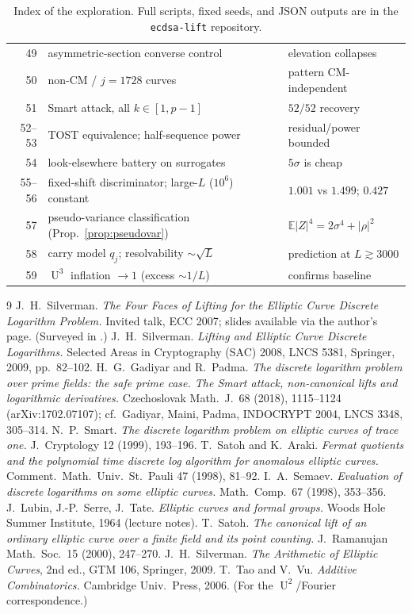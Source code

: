 \documentclass[11pt]{article}
\theoremstyle{definition}
\DeclareMathOperator{\Uk}{U}
\begin{document}
\begin{table}[H]
\begin{tabular}{rll}
\midrule
49     & asymmetric-section converse control & elevation collapses\\
50     & non-CM / $j{=}1728$ curves & pattern CM-independent\\
51     & Smart attack, all $k\in[1,p{-}1]$ & $52/52$ recovery\\
52--53 & TOST equivalence; half-sequence power & residual/power bounded\\
54     & look-elsewhere battery on surrogates & $5\sigma$ is cheap\\
55--56 & fixed-shift discriminator; large-$L$ ($10^6$) constant & $1.001$ vs $1.499$; $0.427$\\
57     & pseudo-variance classification (Prop.~\ref{prop:pseudovar}) & $\mathbb E|Z|^4{=}2\sigma^4{+}|\rho|^2$\\
58     & carry model $q_j$; resolvability $\sim\sqrt L$ & prediction at $L\gtrsim3000$\\
59     & $\Uk^3$ inflation $\to1$ (excess $\sim1/L$) & confirms baseline\\
\bottomrule
\end{tabular}
\caption{Index of the exploration. Full scripts, fixed seeds, and JSON
outputs are in the \texttt{ecdsa-lift} repository.}
\end{table}

\begin{thebibliography}{9}
 J.~H.~Silverman. \emph{The Four Faces of
Lifting for the Elliptic Curve Discrete Logarithm Problem.} Invited talk,
ECC 2007; slides available via the author's page. (Surveyed in
\cite{silvermanlift}.)
 J.~H.~Silverman. \emph{Lifting and Elliptic Curve
Discrete Logarithms.} Selected Areas in Cryptography (SAC) 2008, LNCS
5381, Springer, 2009, pp.\ 82--102.
 H.~G.~Gadiyar and R.~Padma. \emph{The discrete
logarithm problem over prime fields: the safe prime case. The Smart
attack, non-canonical lifts and logarithmic derivatives.} Czechoslovak Math.\ J.\ 68 (2018),
1115--1124 (arXiv:1702.07107); cf.\ Gadiyar, Maini, Padma, INDOCRYPT 2004,
LNCS 3348, 305--314.
 N.~P.~Smart. \emph{The discrete logarithm problem on
elliptic curves of trace one.} J.~Cryptology 12 (1999), 193--196.
 T.~Satoh and K.~Araki. \emph{Fermat quotients and
the polynomial time discrete log algorithm for anomalous elliptic
curves.} Comment.\ Math.\ Univ.\ St.\ Pauli 47 (1998), 81--92.
 I.~A.~Semaev. \emph{Evaluation of discrete logarithms on
some elliptic curves.} Math.\ Comp.\ 67 (1998), 353--356.
 J.~Lubin, J.-P.~Serre, J.~Tate. \emph{Elliptic curves and
formal groups.} Woods Hole Summer Institute, 1964 (lecture notes).
 T.~Satoh. \emph{The canonical lift of an ordinary
elliptic curve over a finite field and its point counting.} J.~Ramanujan
Math.\ Soc.\ 15 (2000), 247--270.
 J.~H.~Silverman. \emph{The Arithmetic of Elliptic
Curves}, 2nd ed., GTM 106, Springer, 2009.
 T.~Tao and V.~Vu. \emph{Additive Combinatorics.}
Cambridge Univ.\ Press, 2006. (For the $\Uk^2$/Fourier correspondence.)
\end{thebibliography}
\end{document}

